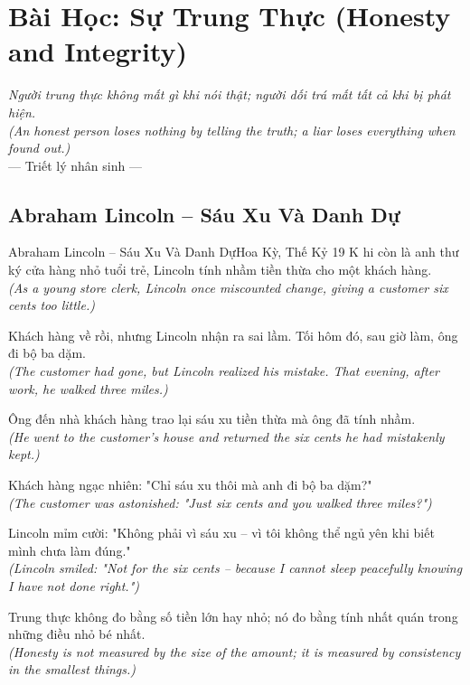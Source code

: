 \chapter{Bài Học: Sự Trung Thực (Honesty and Integrity)}
\begin{center}
  \textit{\color{truyenblue}Người trung thực không mất gì khi nói thật; người dối trá mất tất cả khi bị phát hiện.}\\
  \textit{(An honest person loses nothing by telling the truth; a liar loses everything when found out.)}\\[4pt]
  \small\color{truyengold}--- Triết lý nhân sinh ---
\end{center}
\ngancach

\section{Abraham Lincoln -- Sáu Xu Và Danh Dự}
\begin{truyen}{Abraham Lincoln -- Sáu Xu Và Danh Dự}{Hoa Kỳ, Thế Kỷ 19}
K hi còn là anh thư ký cửa hàng nhỏ tuổi trẻ, Lincoln tính nhầm tiền thừa cho một khách hàng.\\
\textit{(As a young store clerk, Lincoln once miscounted change, giving a customer six cents too little.)}

Khách hàng về rồi, nhưng Lincoln nhận ra sai lầm. Tối hôm đó, sau giờ làm, ông đi bộ ba dặm.\\
\textit{(The customer had gone, but Lincoln realized his mistake. That evening, after work, he walked three miles.)}

Ông đến nhà khách hàng trao lại sáu xu tiền thừa mà ông đã tính nhầm.\\
\textit{(He went to the customer's house and returned the six cents he had mistakenly kept.)}

Khách hàng ngạc nhiên: "Chỉ sáu xu thôi mà anh đi bộ ba dặm?"\\
\textit{(The customer was astonished: "Just six cents and you walked three miles?")}

Lincoln mỉm cười: "Không phải vì sáu xu -- vì tôi không thể ngủ yên khi biết mình chưa làm đúng."\\
\textit{(Lincoln smiled: "Not for the six cents -- because I cannot sleep peacefully knowing I have not done right.")}

\end{truyen}
\begin{baihoc}
  Trung thực không đo bằng số tiền lớn hay nhỏ; nó đo bằng tính nhất quán trong những điều nhỏ bé nhất.\\
  \textit{(Honesty is not measured by the size of the amount; it is measured by consistency in the smallest things.)}
\end{baihoc}


